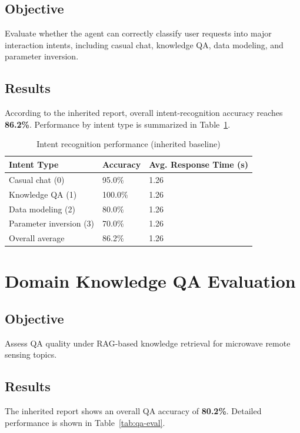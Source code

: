 \subsection{Objective}
Evaluate whether the agent can correctly classify user requests into major interaction intents, including casual chat, knowledge QA, data modeling, and parameter inversion.

\subsection{Results}
According to the inherited report, overall intent-recognition accuracy reaches \textbf{86.2\%}. Performance by intent type is summarized in Table~\ref{tab:intent-eval}.

\begin{table}[htbp]
	\centering
	\caption{Intent recognition performance (inherited baseline)}
	\label{tab:intent-eval}
	\begin{tabular}{lll}
		\hline
		Intent Type & Accuracy & Avg. Response Time (s) \\
		\hline
		Casual chat (0) & 95.0\% & 1.26 \\
		Knowledge QA (1) & 100.0\% & 1.26 \\
		Data modeling (2) & 80.0\% & 1.26 \\
		Parameter inversion (3) & 70.0\% & 1.26 \\
		Overall average & 86.2\% & 1.26 \\
		\hline
	\end{tabular}
\end{table}

\section{Domain Knowledge QA Evaluation}
\label{sec:test-qa}

\subsection{Objective}
Assess QA quality under RAG-based knowledge retrieval for microwave remote sensing topics.

\subsection{Results}
The inherited report shows an overall QA accuracy of \textbf{80.2\%}. Detailed performance is shown in Table~\ref{tab:qa-eval}.

